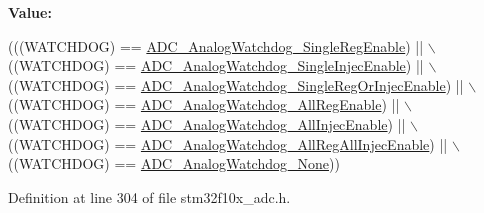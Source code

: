 {\bfseries Value\+:}
\begin{DoxyCode}
(((WATCHDOG) == \hyperlink{group___a_d_c__analog__watchdog__selection_ga2975552a752f44085d9da54b4e76121e}{ADC\_AnalogWatchdog\_SingleRegEnable}) || \(\backslash\)
                                          ((WATCHDOG) == 
      \hyperlink{group___a_d_c__analog__watchdog__selection_gaa9904271617ab69593ac68ae540047fb}{ADC\_AnalogWatchdog\_SingleInjecEnable}) || \(\backslash\)
                                          ((WATCHDOG) == 
      \hyperlink{group___a_d_c__analog__watchdog__selection_gaffd35fc6ceb226ec3fb61fb52227820c}{ADC\_AnalogWatchdog\_SingleRegOrInjecEnable}) || \(\backslash\)
                                          ((WATCHDOG) == 
      \hyperlink{group___a_d_c__analog__watchdog__selection_ga37f08e1a4a452a2c148341b3cfcdeb1e}{ADC\_AnalogWatchdog\_AllRegEnable}) || \(\backslash\)
                                          ((WATCHDOG) == 
      \hyperlink{group___a_d_c__analog__watchdog__selection_gae4d6a7ebb136d924f0c8bad2cbac0574}{ADC\_AnalogWatchdog\_AllInjecEnable}) || \(\backslash\)
                                          ((WATCHDOG) == 
      \hyperlink{group___a_d_c__analog__watchdog__selection_ga25a299f4493aaae316521351198df084}{ADC\_AnalogWatchdog\_AllRegAllInjecEnable}) || \(\backslash\)
                                          ((WATCHDOG) == \hyperlink{group___a_d_c__analog__watchdog__selection_ga91f69979e0e449fef5a8b225a21e3eb9}{ADC\_AnalogWatchdog\_None}))
\end{DoxyCode}


Definition at line 304 of file stm32f10x\+\_\+adc.\+h.

